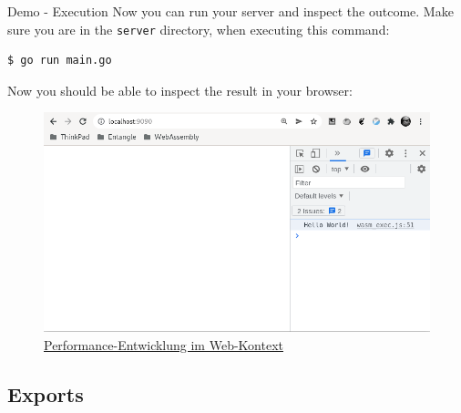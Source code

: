 \documentclass{beamer}
\begin{document}
\begin{frame}[fragile]{Demo - Execution}
    Now you can run your server and inspect the outcome. Make sure you are in the \lstinline{server} directory, when executing this command:
    \begin{lstlisting}[language=bash,basicstyle=\scriptsize]
$ go run main.go
\end{lstlisting}

    Now you should be able to inspect the result in your browser:
    \begin{figure}
        \includegraphics[scale=0.3]{./images/demo.png}
        \caption{\href{https://hacks.mozilla.org/2017/02/a-cartoon-intro-to-webassembly/}{Performance-Entwicklung im Web-Kontext}}
    \end{figure}
\end{frame}

\subsection{Exports}
\end{document}

